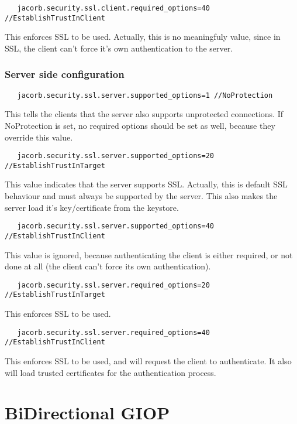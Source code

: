 \documentclass[12pt]{scrbook}
\begin{document}
\begin{verbatim}
   jacorb.security.ssl.client.required_options=40 //EstablishTrustInClient
\end{verbatim}
This enforces SSL to be used. Actually, this is no meaningfuly value, since in
SSL, the client can't force it's own authentication to the server.


\subsection{Server side configuration}

\begin{verbatim}
   jacorb.security.ssl.server.supported_options=1 //NoProtection
\end{verbatim}
This tells the clients that the server also supports unprotected
connections. If NoProtection is set, no required options should be set as
well, because they override this value.

\begin{verbatim}
   jacorb.security.ssl.server.supported_options=20 //EstablishTrustInTarget
\end{verbatim}
This value indicates that the server supports SSL. Actually, this is default
SSL behaviour and must always be supported by the server. This also makes the
server load it's key/certificate from the keystore.

\begin{verbatim}
   jacorb.security.ssl.server.supported_options=40 //EstablishTrustInClient
\end{verbatim}
This value is ignored, because authenticating the client is either
required, or not done at all (the client can't force its own
authentication).

\begin{verbatim}
   jacorb.security.ssl.server.required_options=20 //EstablishTrustInTarget
\end{verbatim}
This enforces SSL to be used.

\begin{verbatim}
   jacorb.security.ssl.server.required_options=40 //EstablishTrustInClient
\end{verbatim}
This enforces SSL to be used, and will request the client to authenticate. It
also will load trusted certificates for the authentication process.


\chapter{BiDirectional GIOP}
\end{document}
